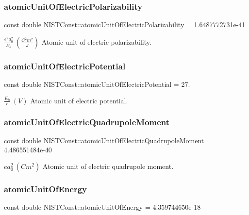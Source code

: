 \subsubsection{\texorpdfstring{atomic\+Unit\+Of\+Electric\+Polarizability}{atomicUnitOfElectricPolarizability}}
{\footnotesize\ttfamily const double N\+I\+S\+T\+Const\+::atomic\+Unit\+Of\+Electric\+Polarizability = 1.\+6487772731e-\/41}

$\frac{e^2 a_0^2}{E_h} \ (\frac{C^2 m^2}{J})$ Atomic unit of electric polarizability. \mbox{\label{group___atomic_unit_ga139c6486b1899658838d403380fc229a}} 
\subsubsection{\texorpdfstring{atomic\+Unit\+Of\+Electric\+Potential}{atomicUnitOfElectricPotential}}
{\footnotesize\ttfamily const double N\+I\+S\+T\+Const\+::atomic\+Unit\+Of\+Electric\+Potential = 27.}

$ \frac{E_h}{e}\ (V)$ Atomic unit of electric potential. \mbox{\label{group___atomic_unit_gae7f2ec900567291168cdf7351248074d}} 
\subsubsection{\texorpdfstring{atomic\+Unit\+Of\+Electric\+Quadrupole\+Moment}{atomicUnitOfElectricQuadrupoleMoment}}
{\footnotesize\ttfamily const double N\+I\+S\+T\+Const\+::atomic\+Unit\+Of\+Electric\+Quadrupole\+Moment = 4.\+486551484e-\/40}

$e a_0^2 \ (C m^2)$ Atomic unit of electric quadrupole moment. \mbox{\label{group___atomic_unit_gadc3fdb8850235efe9e73bcf733fdbfe8}} 
\subsubsection{\texorpdfstring{atomic\+Unit\+Of\+Energy}{atomicUnitOfEnergy}}
{\footnotesize\ttfamily const double N\+I\+S\+T\+Const\+::atomic\+Unit\+Of\+Energy = 4.\+359744650e-\/18}

